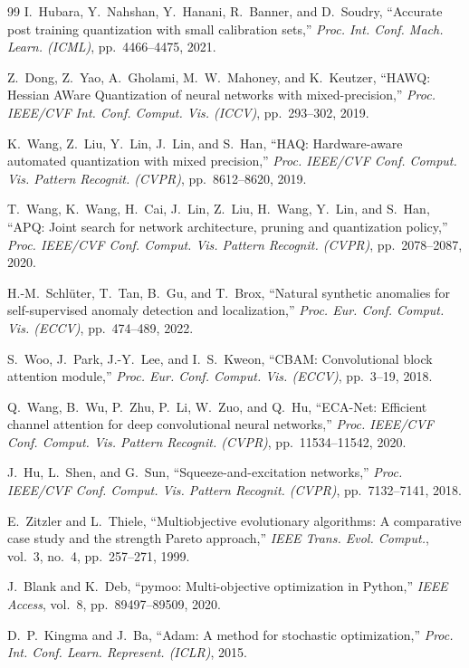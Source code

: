 \documentclass[journal]{IEEEtran}
\begin{document}
\begin{thebibliography}{99}
I.~Hubara, Y.~Nahshan, Y.~Hanani, R.~Banner, and D.~Soudry,
``Accurate post training quantization with small calibration sets,''
\textit{Proc. Int. Conf. Mach. Learn. (ICML)}, pp.~4466--4475, 2021.

Z.~Dong, Z.~Yao, A.~Gholami, M.~W.~Mahoney, and K.~Keutzer,
``HAWQ: Hessian AWare Quantization of neural networks with mixed-precision,''
\textit{Proc. IEEE/CVF Int. Conf. Comput. Vis. (ICCV)}, pp.~293--302, 2019.

K.~Wang, Z.~Liu, Y.~Lin, J.~Lin, and S.~Han,
``HAQ: Hardware-aware automated quantization with mixed precision,''
\textit{Proc. IEEE/CVF Conf. Comput. Vis. Pattern Recognit. (CVPR)}, pp.~8612--8620, 2019.

T.~Wang, K.~Wang, H.~Cai, J.~Lin, Z.~Liu, H.~Wang, Y.~Lin, and S.~Han,
``APQ: Joint search for network architecture, pruning and quantization policy,''
\textit{Proc. IEEE/CVF Conf. Comput. Vis. Pattern Recognit. (CVPR)}, pp.~2078--2087, 2020.

H.-M.~Schl\"{u}ter, T.~Tan, B.~Gu, and T.~Brox,
``Natural synthetic anomalies for self-supervised anomaly detection and localization,''
\textit{Proc. Eur. Conf. Comput. Vis. (ECCV)}, pp.~474--489, 2022.

S.~Woo, J.~Park, J.-Y.~Lee, and I.~S.~Kweon,
``CBAM: Convolutional block attention module,''
\textit{Proc. Eur. Conf. Comput. Vis. (ECCV)}, pp.~3--19, 2018.

Q.~Wang, B.~Wu, P.~Zhu, P.~Li, W.~Zuo, and Q.~Hu,
``ECA-Net: Efficient channel attention for deep convolutional neural networks,''
\textit{Proc. IEEE/CVF Conf. Comput. Vis. Pattern Recognit. (CVPR)}, pp.~11534--11542, 2020.

J.~Hu, L.~Shen, and G.~Sun,
``Squeeze-and-excitation networks,''
\textit{Proc. IEEE/CVF Conf. Comput. Vis. Pattern Recognit. (CVPR)}, pp.~7132--7141, 2018.

E.~Zitzler and L.~Thiele,
``Multiobjective evolutionary algorithms: A comparative case study and the strength Pareto approach,''
\textit{IEEE Trans. Evol. Comput.}, vol.~3, no.~4, pp.~257--271, 1999.

J.~Blank and K.~Deb,
``pymoo: Multi-objective optimization in Python,''
\textit{IEEE Access}, vol.~8, pp.~89497--89509, 2020.

D.~P.~Kingma and J.~Ba,
``Adam: A method for stochastic optimization,''
\textit{Proc. Int. Conf. Learn. Represent. (ICLR)}, 2015.


\end{thebibliography}
\end{document}
